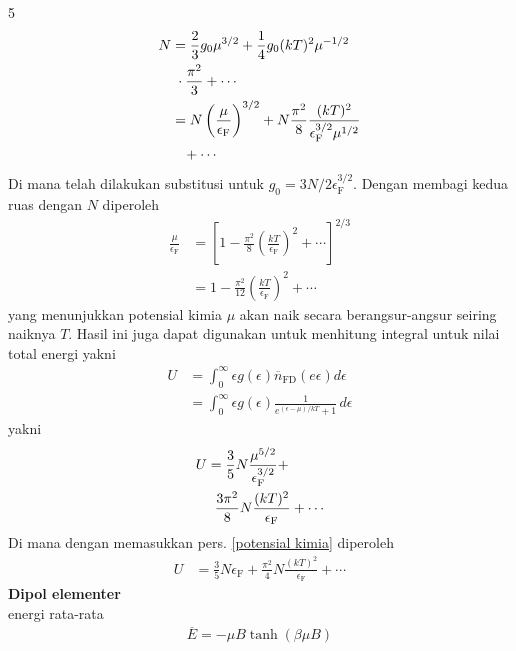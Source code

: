 \documentclass[a4paper  , 6 pt]{article}
\begin{document}
\begin{tiny}
\begin{multicols} {5}
\begin{align}
 N & = \frac{2}{3} g_0 \mu^{3/2} + \frac{1}{4} g_0 (kT)^2 \mu^{-1/2}\nonumber \\
 & \hspace{0.1 cm }  \cdot \frac{\pi^2} {3} + \cdots \nonumber \\
 & = N \left(\frac{\mu}{\epsilon_\mathrm{F}}\right)^{3/2 } + N \frac{\pi^2}{8} \frac{(kT) ^2}{\epsilon_\mathrm{F}^{3/2} \mu^{1/2}} \nonumber \\
 & \hspace{0.3 cm } + \cdots
 \end{align}
 Di mana telah dilakukan substitusi untuk $g_0  = 3N / 2 \epsilon_\mathrm{F}^{3/2}$. Dengan membagi kedua ruas dengan $N$ diperoleh
 \begin{align}
 \frac{\mu}{\epsilon_\mathrm{F}}  &=  \left [  1 -  \frac{\pi^2}{8} \left(\frac{kT}{\epsilon_\mathrm{F}}\right)^2 + \cdots\right]^{2/3} \nonumber \\
 & = 1- \frac{\pi^2}{12} \left(\frac{kT}{\epsilon_\mathrm{F}}\right)^2  + \cdots \label{potensial kimia}
 \end{align} 
 yang menunjukkan  potensial kimia $\mu$ akan naik secara berangsur-angsur seiring naiknya $T$. \newline
 Hasil ini juga dapat digunakan untuk menhitung integral untuk nilai total energi yakni
 \begin{align}
 U &= \int_{0}^{\infty} \epsilon g(\epsilon) \overline{n}_\mathrm{FD} (e\epsilon) d \epsilon \nonumber \\
 & = \int_{0}^{\infty} \epsilon g(\epsilon) \frac{1}{e^{(\epsilon - \mu)/kT}+1}  \, d\epsilon 
 \end{align}
yakni 
\begin{align}
U& =\frac{3}{5} N \frac{\mu^{5/2}}{\epsilon_\mathrm{F}^{3/2}} + \nonumber \\
& \hspace{0.2 cm} \frac{3\pi^2 }{8} N \frac{(kT)^2}{\epsilon_\mathrm{F}} + \cdots
\end{align}
Di mana dengan memasukkan pers. \ref{potensial kimia} diperoleh
\begin{align}
U&  = \frac{3}{5} N \epsilon_\mathrm{F} + \frac{\pi^2}{4} N \frac{(kT)^2}{\epsilon_\mathrm{F}} + \cdots
\end{align}
 \textbf{ Dipol elementer}\\
energi rata-rata 
\begin{align}
\overline{E} = - \mu B \tanh (\beta \mu B) 
\end{align}
\begin{align}

\end{align}
\end{multicols}
\end{tiny}
\end{document}

